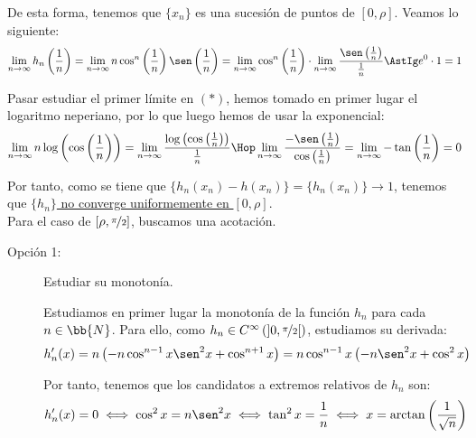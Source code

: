 \begin{ejercicio}
    De esta forma, tenemos que $\{x_n\}$ es una sucesión de puntos de $[0,\rho]$. Veamos lo siguiente:
    \begin{equation*}
        \lim_{n\to \infty}h_n\left(\frac{1}{n}\right) = \lim_{n\to \infty}n\cos^n\left(\frac{1}{n}\right)\sen\left(\frac{1}{n}\right) =
        \lim_{n\to \infty} \cos^n\left(\frac{1}{n}\right)\cdot \lim_{n\to \infty} \frac{\sen\left(\frac{1}{n}\right)}{\frac{1}{n}} \AstIg e^0\cdot 1 = 1
    \end{equation*}

    Pasar estudiar el primer límite en $(\ast)$, hemos tomado en primer lugar el logaritmo neperiano, por lo que luego hemos de usar la exponencial:
    \begin{equation*}
        \lim_{n\to \infty} n \log\left(\cos\left(\frac{1}{n}\right)\right) = \lim_{n\to \infty} \frac{\log\left(\cos\left(\frac{1}{n}\right)\right)}{\frac{1}{n}} \Hop
        \lim_{n\to \infty} \frac{-\sen\left(\frac{1}{n}\right)}{\cos\left(\frac{1}{n}\right)}
        = \lim_{n\to \infty} -\tan \left(\frac{1}{n}\right) = 0
    \end{equation*}

    Por tanto, como se tiene que $\{h_n(x_n)-h(x_n)\}=\{h_n(x_n)\}\to 1$, tenemos que \ul{$\{h_n\}$ no converge uniformemente en $[0,\rho]$}.\\

    Para el caso de $[\rho,\nicefrac{\pi}{2}]$, buscamos una acotación.
    
    \begin{description}
        \item[Opción 1:] Estudiar su monotonía.
        
        Estudiamos en primer lugar la monotonía de la función $h_n$ para cada $n\in \bb{N}$. Para ello, como $h_n\in C^\infty\left(\left]0,\nicefrac{\pi}{2}\right[\right)$, estudiamos
        su derivada:
        \begin{equation*}
            h_n'(x) = n\left(-n\cos^{n-1}x\sen^2 x + \cos^{n+1} x\right) = n\cos^{n-1}x\left(-n\sen^2 x + \cos^2 x\right)
        \end{equation*}

        Por tanto, tenemos que los candidatos a extremos relativos de $h_n$ son:
        \begin{equation*}
            h_n'(x) = 0 \iff \cos^2 x = n\sen^2 x \iff \tan^2 x = \frac{1}{n}
            \iff x = \arctan\left(\frac{1}{\sqrt{n}}\right)
        \end{equation*}


\end{description}
\end{ejercicio}
